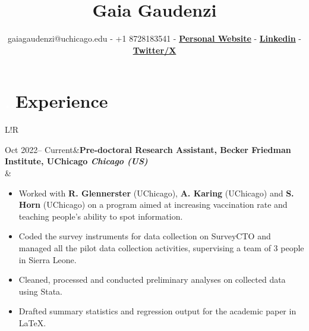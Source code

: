 \documentclass[10pt]{article}
\title{\bfseries\Huge Gaia Gaudenzi}
\author{gaiagaudenzi@uchicago.edu - +1 8728183541 - 
{\textcolor{bluelink}{\bf \href{https://gaiagaudenzi-lab.github.io/}{Personal Website}}} - 
{\textcolor{bluelink}{\bf \href{https://www.linkedin.com/in/gaiagaudenzi/}{Linkedin}}} - 
{\textcolor{bluelink}{\bf \href{https://twitter.com/GaudenziGaia}{Twitter/X}}}}
\date{} %
\newcommand\VRule{\color{lightgray}\vrule width 0.5pt}
\begin{document}
\maketitle

\vspace{-3pc}
\section*{\textcolor{white}{..}Experience}
\vspace{-0.5pc}
\begin{tabular}{L!{\VRule}R}

\small{Oct 2022-- Current}&{\bf Pre-doctoral Research Assistant, Becker Friedman Institute, UChicago \textit{Chicago (US)}}\\
&{\vspace{-0.5pc}
\begin{itemize}[leftmargin=1em,noitemsep,topsep=-2pt]
\item Worked with \textbf{R. Glennerster} (UChicago), \textbf{A. Karing} (UChicago) and \textbf{S. Horn} (UChicago) on a program aimed at increasing vaccination rate and teaching people's ability to spot information.
\item Coded the survey instruments for data collection on SurveyCTO and managed all the pilot data collection activities, supervising a team of 3 people in Sierra Leone.
\item Cleaned, processed and conducted preliminary analyses on collected data using Stata.
\item Drafted summary statistics and regression output for the academic paper in LaTeX.
\end{itemize}
}\\
\vspace{-1.3pc}


\end{tabular}
\end{document}
